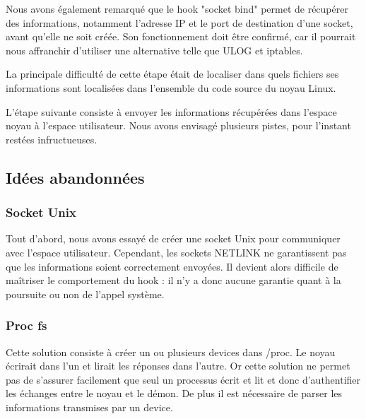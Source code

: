 \documentclass[pdftex,a4paper,titlepage,11pt,openright]{article}
\begin{document}
Nous avons également remarqué que le hook "socket bind" permet de récupérer des informations, notamment l'adresse IP et le port de destination d'une socket, avant qu'elle ne soit créée. Son fonctionnement doit être confirmé, car il pourrait nous affranchir d'utiliser une alternative telle que ULOG et iptables.

La principale difficulté de cette étape était de localiser dans quels fichiers ses informations sont localisées dans l'ensemble du code source du noyau Linux.

L'étape suivante consiste à envoyer les informations récupérées dans l'espace noyau à l'espace utilisateur. Nous avons envisagé plusieurs pistes, pour l'instant restées infructueuses.

\newpage

\subsection{Idées abandonnées}

\subsubsection{Socket Unix}

Tout d'abord, nous avons essayé de créer une socket Unix pour communiquer avec l'espace utilisateur. Cependant, les sockets NETLINK ne garantissent pas que les informations soient correctement envoyées. Il devient alors difficile de maîtriser le comportement du hook : il n'y a donc aucune garantie quant à la poursuite ou non de l'appel système.

\subsubsection{Proc fs}

Cette solution consiste à créer un ou plusieurs devices dans /proc. Le noyau écrirait dans l'un et lirait les réponses dans l'autre. Or cette solution ne permet pas de s'assurer facilement que seul un processus écrit et lit et donc d'authentifier les échanges entre le noyau et le démon. De plus il est nécessaire de parser les informations transmises par un device.
\end{document}
